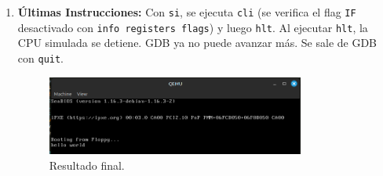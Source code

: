 \begin{enumerate}[noitemsep]
    \item \textbf{Últimas Instrucciones:} Con \texttt{si}, se ejecuta \texttt{cli} (se verifica el flag \texttt{IF} desactivado con \texttt{info registers flags}) y luego \texttt{hlt}. Al ejecutar \texttt{hlt}, la CPU simulada se detiene. GDB ya no puede avanzar más. Se sale de GDB con \texttt{quit}.
    \begin{figure}[H]
        \centering
        \includegraphics[width=0.8\textwidth]{images/resultado.png}
        \caption{Resultado final.}
    \end{figure}
\end{enumerate}
